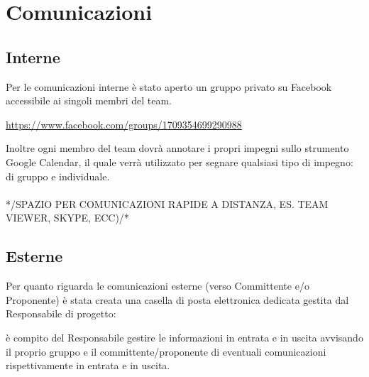 \section{Comunicazioni}{
	\subsection{Interne}{
		Per le comunicazioni interne \`{e} stato aperto un gruppo privato su Facebook accessibile ai singoli membri del team. \begin{center}
			\url{https://www.facebook.com/groups/1709354699290988}
		\end{center} 
		Inoltre ogni membro del team dovr\`{a} annotare i propri impegni sullo strumento Google Calendar, il quale verr\`{a} utilizzato per segnare qualsiasi tipo di impegno: di gruppo e individuale.\\\\*/SPAZIO PER COMUNICAZIONI RAPIDE A DISTANZA, ES. TEAM VIEWER, SKYPE, ECC)/*
		
	 }
	\subsection{Esterne}{
	Per quanto riguarda le comunicazioni esterne (verso Committente e/o Proponente) \`{e} stata creata una casella di posta elettronica dedicata gestita dal Responsabile di progetto: \begin{center}
		\href{mailto:\mail}{\mail} \end{center} \`{e} compito del Responsabile gestire le informazioni in entrata e in uscita avvisando il proprio gruppo e il committente/proponente di eventuali comunicazioni rispettivamente in entrata e in uscita.
		}
}
